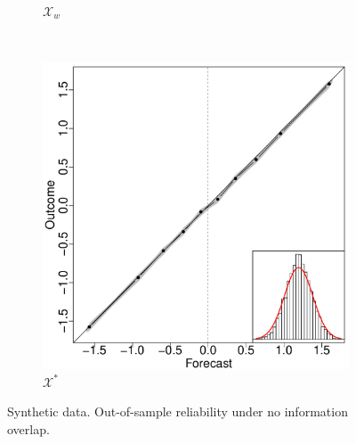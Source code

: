 \documentclass[11pt]{article}
\theoremstyle{definition}
\theoremstyle{definition}
\begin{document}
\begin{figure}[t!]
\begin{subfigure}[b]{0.323\textwidth}
                \caption{$\mathcal{X}_w$}
        \label{RelOWANo}
        \end{subfigure}
        ~ %
        \begin{subfigure}[b]{0.323\textwidth}
                \includegraphics[width=\textwidth]{SimIndepELOP}
                \caption{$\mathcal{X}^*$ }
        \label{RelEOWANo}
        \end{subfigure}
          \caption{Synthetic data. Out-of-sample reliability under no information overlap. }
        \label{NOVerlap}
\end{figure}
\end{document}
